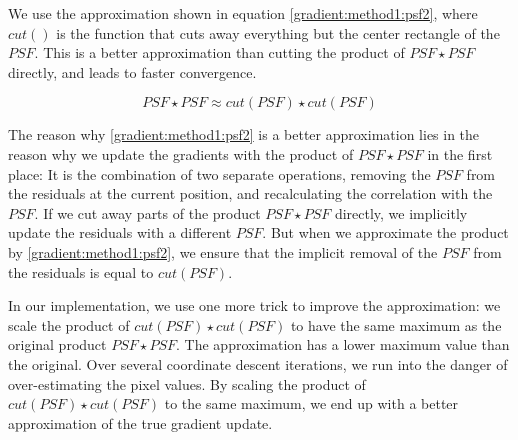 We use the approximation shown in equation \eqref{gradient:method1:psf2}, where $cut()$ is the function that cuts away everything but the center rectangle of the $PSF$. This is a better approximation than cutting the product of $PSF \star PSF$ directly, and leads to faster convergence.

\begin{equation}\label{gradient:method1:psf2}
PSF \star PSF \approx cut(PSF) \star cut(PSF)
\end{equation}

The reason why \eqref{gradient:method1:psf2} is a better approximation lies in the reason why we update the gradients with the product of $PSF \star PSF$ in the first place: It is the combination of two separate operations, removing the $PSF$ from the residuals at the current position, and recalculating the correlation with the $PSF$. If we cut away parts of the product $PSF \star PSF$ directly, we implicitly update the residuals with a different $PSF$. But when we approximate the product by \eqref{gradient:method1:psf2}, we ensure that the implicit removal of the $PSF$ from the residuals is equal to $cut(PSF)$.

In our implementation, we use one more trick to improve the approximation: we scale the product of $cut(PSF) \star cut(PSF)$ to have the same maximum as the original product $PSF \star PSF$. The approximation has a lower maximum value than the original. Over several coordinate descent iterations, we run into the danger of over-estimating the pixel values. By scaling the product of $cut(PSF) \star cut(PSF)$ to the same maximum, we end up with a better approximation of the true gradient update.


